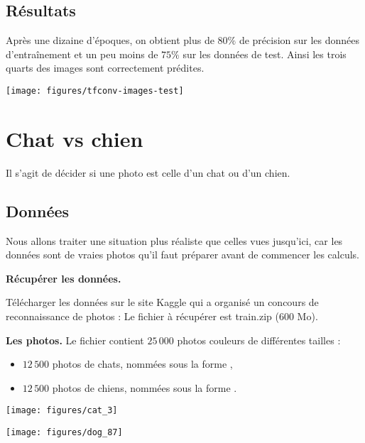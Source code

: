\documentclass[11pt,class=report,crop=false]{standalone}
\begin{document}
\subsection{Résultats}

Après une dizaine d'époques, on obtient plus de $80\%$ de précision sur les données d'entraînement et un peu moins de $75\%$ sur les données de test. Ainsi les trois quarts des images sont correctement prédites.

\begin{center}
\texttt{[image: figures/tfconv-images-test]}
\end{center}



\section{Chat vs chien}

Il s'agit de décider si une photo est celle d'un chat ou d'un chien.

\subsection{Données}

Nous allons traiter une situation plus réaliste que celles vues jusqu'ici, car les données sont de \og{}vraies\fg{} photos qu'il faut préparer avant de commencer les calculs.

\textbf{Récupérer les données.}

Télécharger les données sur le site \og{}Kaggle\fg{} qui a organisé un concours de reconnaissance de photos :
Le fichier à récupérer est \og{}train.zip\fg{} ($600$ Mo).

\textbf{Les photos.}
Le fichier contient $25\,000$ photos couleurs de différentes tailles :
\begin{itemize} 
  \item $12\,500$ photos de chats, nommées sous la forme ,
  \item $12\,500$ photos de chiens, nommées sous la forme .    
\end{itemize}

\begin{center}
\begin{minipage}{0.45\textwidth}
\texttt{[image: figures/cat\_3]}
\end{minipage}
\begin{minipage}{0.45\textwidth}
\texttt{[image: figures/dog\_87]}
\end{minipage}
\end{center}
\end{document}
